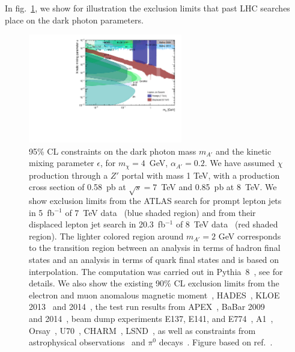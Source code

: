 In fig.~\ref{fig:radiating-dm-limits}, we show for
illustration the exclusion limits that past LHC searches place on the dark photon
parameters.

\begin{figure}
  \begin{center}
    \includegraphics[width=0.6\textwidth]{figures/DS_DarkPhoton_Constraints.pdf}
  \end{center}
  \vspace{-0.7cm}
  \caption{
    95\% CL constraints on the dark photon mass $m_{A'}$ and the kinetic mixing
    parameter $\epsilon$, for $m_\chi = 4$~GeV, $\alpha_{A'} = 0.2$.  We have
    assumed $\chi$ production through a $Z'$ portal with mass 1 TeV, with a production cross
    section of 0.58~pb at $\sqrt{s} = 7$~TeV and 0.85~pb at 8~TeV.
    We show exclusion limits from the ATLAS search for prompt lepton
    jets in 5~fb$^{-1}$ of 7~TeV data~\cite{Aad:2012qua} (blue shaded region)
    and from their displaced lepton jet search in 20.3~fb$^{-1}$ of 8~TeV
    data~\cite{Aad:2014yea} (red shaded region).
    The lighter colored region around $m_{A'}=2$ GeV corresponds to the
    transition region between an analysis in terms of hadron final states and
    an analysis in terms of quark final states and is based on interpolation.
    The computation was carried out in Pythia~8~\cite{Carloni:2010tw,
    Carloni:2011kk, Sjostrand:2014zea}, see \cite{Buschmann:2015awa} for
    details.  We also show the existing 90\% CL exclusion limits from the
    electron and muon anomalous magnetic
    moment~\cite{Pospelov:2008zw,Davoudiasl:2012ig,Endo:2012hp},
    HADES~\cite{Agakishiev:2013fwl}, KLOE 2013~\cite{Babusci:2012cr} and
    2014~\cite{Babusci:2014sta}, the test run results from
    APEX~\cite{Abrahamyan:2011gv}, BaBar 2009~\cite{Aubert:2009cp} and
    2014~\cite{Lees:2014xha}, beam dump experiments E137, E141, and
    E774~\cite{Blumlein:2011mv,Bjorken:2009mm,Bross:1989mp},
    A1~\cite{Merkel:2011ze}, Orsay~\cite{Davier:1989wz},
    U70~\cite{Blumlein:2013cua}, CHARM~\cite{Gninenko:2012eq},
    LSND~\cite{Essig:2010gu}, as well as constraints from astrophysical
    observations~\cite{Dent:2012mx,Dreiner:2013mua} and $\pi^0$
    decays~\cite{CERNNA48/2:2015lha}. Figure based on
    ref.~\cite{Buschmann:2015awa}.}
  \label{fig:radiating-dm-limits}
\end{figure}





